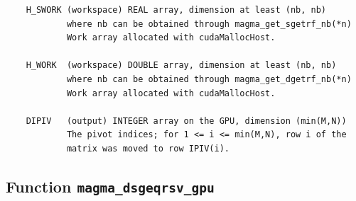 \documentclass[10pt]{book}
\begin{document}
\begin{verbatim}
    H_SWORK (workspace) REAL array, dimension at least (nb, nb)
            where nb can be obtained through magma_get_sgetrf_nb(*n)
            Work array allocated with cudaMallocHost.

    H_WORK  (workspace) DOUBLE array, dimension at least (nb, nb)
            where nb can be obtained through magma_get_dgetrf_nb(*n)
            Work array allocated with cudaMallocHost.

    DIPIV   (output) INTEGER array on the GPU, dimension (min(M,N))
            The pivot indices; for 1 <= i <= min(M,N), row i of the
            matrix was moved to row IPIV(i).
\end{verbatim}

\newpage
\subsection{Function {\tt {\bf magma\_dsgeqrsv\_gpu}}}
\end{document}
